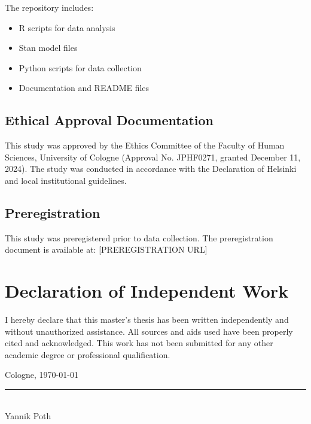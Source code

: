 The repository includes:
\begin{itemize}
\item R scripts for data analysis
\item Stan model files
\item Python scripts for data collection
\item Documentation and README files
\end{itemize}

\subsection{Ethical Approval Documentation}

This study was approved by the Ethics Committee of the Faculty of Human Sciences, University of Cologne (Approval No. JPHF0271, granted December 11, 2024). The study was conducted in accordance with the Declaration of Helsinki and local institutional guidelines.

\subsection{Preregistration}

This study was preregistered prior to data collection. The preregistration document is available at: [PREREGISTRATION URL]

\section{Declaration of Independent Work}

I hereby declare that this master's thesis has been written independently and without unauthorized assistance. All sources and aids used have been properly cited and acknowledged. This work has not been submitted for any other academic degree or professional qualification.

\vspace{2cm}

\noindent
Cologne, \today

\vspace{2cm}

\noindent
\rule{6cm}{0.4pt}\\
Yannik Poth 